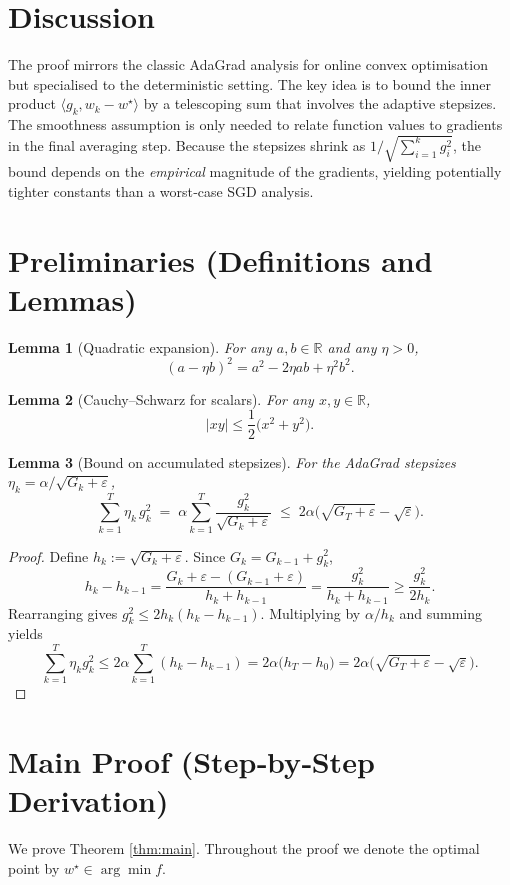 \documentclass{article}
\newtheorem{lemma}{Lemma}
\newcommand{\R}{\mathbb{R}}
\begin{document}
\section*{Discussion}
The proof mirrors the classic AdaGrad analysis for online convex optimisation
but specialised to the deterministic setting. The key idea is to bound the
inner product $\langle g_k,w_k-w^{\star}\rangle$ by a telescoping sum that
involves the adaptive stepsizes. The smoothness assumption is only needed
to relate function values to gradients in the final averaging step.
Because the stepsizes shrink as $1/\sqrt{\sum_{i=1}^{k}g_i^{2}}$, the bound
depends on the \emph{empirical} magnitude of the gradients, yielding
potentially tighter constants than a worst‑case SGD analysis.

\newpage
\section*{Preliminaries (Definitions and Lemmas)}
\begin{lemma}[Quadratic expansion]\label{lem:quad}
For any $a,b\in\R$ and any $\eta>0$,
\[
(a-\eta b)^{2}=a^{2}-2\eta a b+\eta^{2}b^{2}.
\]
\end{lemma}
\begin{lemma}[Cauchy–Schwarz for scalars]\label{lem:cs}
For any $x,y\in\R$,
\[
|xy|\le\frac{1}{2}\bigl(x^{2}+y^{2}\bigr).
\]
\end{lemma}
\begin{lemma}[Bound on accumulated stepsizes]\label{lem:sumeta}
For the AdaGrad stepsizes $\eta_k=\alpha/\sqrt{G_k+\varepsilon}$,
\[
\sum_{k=1}^{T}\eta_k\, g_k^{2}
\;=\;
\alpha\sum_{k=1}^{T}\frac{g_k^{2}}{\sqrt{G_k+\varepsilon}}
\;\le\;
2\alpha\bigl(\sqrt{G_T+\varepsilon}-\sqrt{\varepsilon}\bigr).
\]
\end{lemma}
\begin{proof}
Define $h_k:=\sqrt{G_k+\varepsilon}$. 
Since $G_k=G_{k-1}+g_k^{2}$,
\[
h_k-h_{k-1}
=\frac{G_k+\varepsilon-(G_{k-1}+\varepsilon)}{h_k+h_{k-1}}
=\frac{g_k^{2}}{h_k+h_{k-1}}
\ge\frac{g_k^{2}}{2h_k}.
\]
Rearranging gives $g_k^{2}\le 2h_k(h_k-h_{k-1})$.
Multiplying by $\alpha/h_k$ and summing yields
\[
\sum_{k=1}^{T}\eta_k g_k^{2}
\le 2\alpha\sum_{k=1}^{T}(h_k-h_{k-1})
=2\alpha\bigl(h_T-h_0\bigr)
=2\alpha\bigl(\sqrt{G_T+\varepsilon}-\sqrt{\varepsilon}\bigr).
\]
\end{proof}

\section*{Main Proof (Step‑by‑Step Derivation)}
We prove Theorem \ref{thm:main}. Throughout the proof we denote the optimal
point by $w^{\star}\in\arg\min f$.
\end{document}
